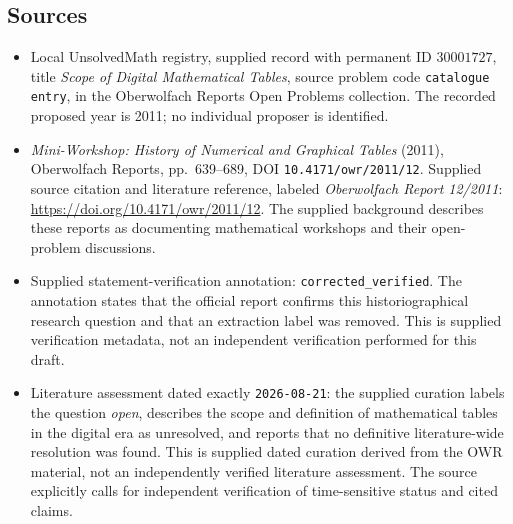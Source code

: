 \documentclass[11pt]{article}
\begin{document}
\subsection{Sources}
\begin{itemize}
\item Local UnsolvedMath registry, supplied record with permanent ID \(30001727\), title \emph{Scope of Digital Mathematical Tables}, source problem code \texttt{catalogue entry}, in the Oberwolfach Reports Open Problems collection. The recorded proposed year is 2011; no individual proposer is identified.
\item \emph{Mini-Workshop: History of Numerical and Graphical Tables} (2011), Oberwolfach Reports, pp.\ 639--689, DOI \texttt{10.4171/owr/2011/12}. Supplied source citation and literature reference, labeled \emph{Oberwolfach Report 12/2011}: \url{https://doi.org/10.4171/owr/2011/12}. The supplied background describes these reports as documenting mathematical workshops and their open-problem discussions.
\item Supplied statement-verification annotation: \texttt{corrected\_verified}. The annotation states that the official report confirms this historiographical research question and that an extraction label was removed. This is supplied verification metadata, not an independent verification performed for this draft.
\item Literature assessment dated exactly \texttt{2026-08-21}: the supplied curation labels the question \emph{open}, describes the scope and definition of mathematical tables in the digital era as unresolved, and reports that no definitive literature-wide resolution was found. This is supplied dated curation derived from the OWR material, not an independently verified literature assessment. The source explicitly calls for independent verification of time-sensitive status and cited claims.
\end{itemize}
\end{document}
